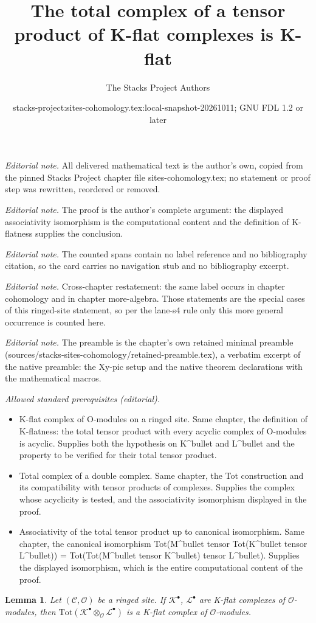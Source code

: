 \documentclass[10pt,a4paper]{amsart}
\title{The total complex of a tensor product of K-flat complexes is K-flat}
\author{The Stacks Project Authors}
\date{stacks-project:sites-cohomology.tex:local-snapshot-20261011; GNU FDL 1.2 or later}
\theoremstyle{plain}
\newtheorem{lemma}[subsection]{Lemma}
\theoremstyle{definition}
\theoremstyle{remark}
\numberwithin{equation}{subsection}
\begin{document}
\maketitle
\noindent\textit{Editorial note.} All delivered mathematical text is the author's own, copied from the pinned Stacks Project chapter file sites-cohomology.tex; no statement or proof step was rewritten, reordered or removed.\par\medskip
\noindent\textit{Editorial note.} The proof is the author's complete argument: the displayed associativity isomorphism is the computational content and the definition of K-flatness supplies the conclusion.\par\medskip
\noindent\textit{Editorial note.} The counted spans contain no label reference and no bibliography citation, so the card carries no navigation stub and no bibliography excerpt.\par\medskip
\noindent\textit{Editorial note.} Cross-chapter restatement: the same label occurs in chapter cohomology and in chapter more-algebra. Those statements are the special cases of this ringed-site statement, so per the lane-s4 rule only this more general occurrence is counted here.\par\medskip
\noindent\textit{Editorial note.} The preamble is the chapter's own retained minimal preamble (sources/stacks-sites-cohomology/retained-preamble.tex), a verbatim excerpt of the native preamble: the Xy-pic setup and the native theorem declarations with the mathematical macros.\par\medskip
\noindent\textit{Allowed standard prerequisites (editorial).}\begin{itemize}
\item K-flat complex of O-modules on a ringed site. Same chapter, the definition of K-flatness: the total tensor product with every acyclic complex of O-modules is acyclic. Supplies both the hypothesis on K\textasciicircum{}bullet and L\textasciicircum{}bullet and the property to be verified for their total tensor product.
\item Total complex of a double complex. Same chapter, the Tot construction and its compatibility with tensor products of complexes. Supplies the complex whose acyclicity is tested, and the associativity isomorphism displayed in the proof.
\item Associativity of the total tensor product up to canonical isomorphism. Same chapter, the canonical isomorphism Tot(M\textasciicircum{}bullet tensor Tot(K\textasciicircum{}bullet tensor L\textasciicircum{}bullet)) = Tot(Tot(M\textasciicircum{}bullet tensor K\textasciicircum{}bullet) tensor L\textasciicircum{}bullet). Supplies the displayed isomorphism, which is the entire computational content of the proof.
\end{itemize}\medskip
\begin{lemma}
\label{lemma-tensor-product-K-flat}
Let $(\mathcal{C}, \mathcal{O})$ be a ringed site.
If $\mathcal{K}^\bullet$, $\mathcal{L}^\bullet$ are K-flat complexes
of $\mathcal{O}$-modules, then
$\text{Tot}(\mathcal{K}^\bullet \otimes_\mathcal{O} \mathcal{L}^\bullet)$
is a K-flat complex of $\mathcal{O}$-modules.
\end{lemma}
\end{document}
